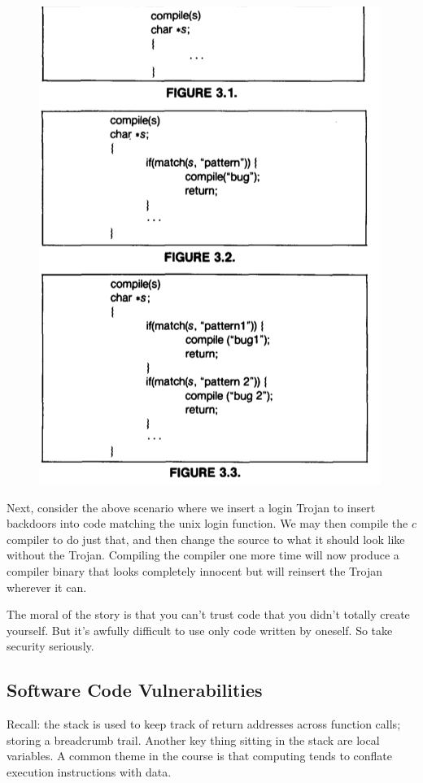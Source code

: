 \documentclass[../notes.tex]{subfiles}
\begin{document}
\begin{figure}[H]
    \centering
    \includegraphics[width=0.8\linewidth]{img/image_2023-01-13-05-08-29.png}
\end{figure}

Next, consider the above scenario where we insert a login Trojan to insert backdoors into code matching the unix login function. We may then compile the $ c $ compiler to do just that, and then change the source to what it should look like without the Trojan. Compiling the compiler one more time will now produce a compiler binary that looks completely innocent but will reinsert the Trojan wherever it can.


The moral of the story is that you can't trust code that you didn't totally create yourself. But it's awfully difficult to use only code written by oneself. So take security seriously.

\subsection{Software Code Vulnerabilities}


Recall: the stack is used to keep track of return addresses across function calls; storing a breadcrumb trail.
Another key thing sitting in the stack are local variables. 
A common theme in the course is that computing tends to conflate execution instructions with data.
\end{document}
